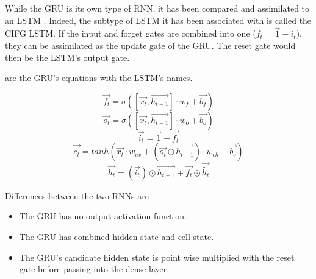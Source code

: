 While the \ac{GRU} is its own type of \ac{RNN}, it has been compared and assimilated to an \ac{LSTM} \cite{nbLSTM}. Indeed, the subtype of \ac{LSTM} it has been associated with is called the \ac{CIFG} \ac{LSTM}. If the input and forget gates are combined into one ($f_t=\overrightarrow{1}-i_t$), they can be assimilated as the update gate of the \ac{GRU}. The reset gate would then be the \ac{LSTM}'s output gate.

 are the \ac{GRU}'s equations with the \ac{LSTM}'s names.

\begin{equation}\label{eq:lstmGru0}
  \overrightarrow{f_t}=\sigma ([\overrightarrow{x_t},\overrightarrow{h_{t-1}}] \cdot w_f + \overrightarrow{b_f})
\end{equation}
\begin{equation}\label{eq:lstmGru1}
  \overrightarrow{o_t}=\sigma ([\overrightarrow{x_t},\overrightarrow{h_{t-1}}] \cdot w_o + \overrightarrow{b_o})
\end{equation}
\begin{equation}\label{eq:lstmGru2}
  \overrightarrow{i_t}=\overrightarrow{1}-\overrightarrow{f_t}
\end{equation}
\begin{equation}\label{eq:lstmGru3}
  \overrightarrow{\tilde{c_t}}=tanh(\overrightarrow{x_t}\cdot w_{cx}+(\overrightarrow{o_t}\odot\overrightarrow{h_{t-1}}) \cdot w_{ch} + \overrightarrow{b_c})
\end{equation}
\begin{equation}\label{eq:lstmGru4}
  \overrightarrow{h_t}=(\overrightarrow{i_t})\odot \overrightarrow{h_{t-1}} + \overrightarrow{f_t}\odot \overrightarrow{\tilde{h_t}}
\end{equation}

Differences between the two \acp{RNN} are :
\begin{itemize}
  \item The \ac{GRU} has no output activation function.
  \item The \ac{GRU} has combined hidden state and cell state.
  \item The \ac{GRU}'s candidate hidden state is point wise multiplied with the reset gate before passing into the dense layer.
\end{itemize}

